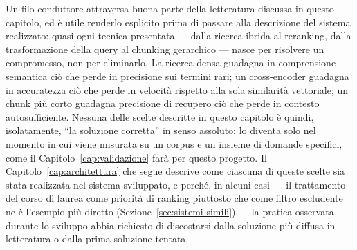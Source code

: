 Un filo conduttore attraversa buona parte della letteratura discussa in questo capitolo, ed è utile renderlo
esplicito prima di passare alla descrizione del sistema realizzato: quasi ogni tecnica presentata --- dalla ricerca
ibrida al reranking, dalla trasformazione della query al chunking gerarchico --- nasce per risolvere un compromesso,
non per eliminarlo. La ricerca densa guadagna in comprensione semantica ciò che perde in precisione sui termini
rari; un cross-encoder guadagna in accuratezza ciò che perde in velocità rispetto alla sola similarità vettoriale;
un chunk più corto guadagna precisione di recupero ciò che perde in contesto autosufficiente. Nessuna delle scelte
descritte in questo capitolo è quindi, isolatamente, ``la soluzione corretta'' in senso assoluto: lo diventa solo
nel momento in cui viene misurata su un corpus e un insieme di domande specifici, come il Capitolo~\ref{cap:validazione}
farà per questo progetto. Il Capitolo~\ref{cap:architettura} che segue descrive come ciascuna di queste scelte sia
stata realizzata nel sistema sviluppato, e perché, in alcuni casi --- il trattamento del corso di laurea come
priorità di ranking piuttosto che come filtro escludente ne è l'esempio più diretto (Sezione~\ref{sec:sistemi-simili}) ---
la pratica osservata durante lo sviluppo abbia richiesto di discostarsi dalla soluzione più diffusa in letteratura o
dalla prima soluzione tentata.
